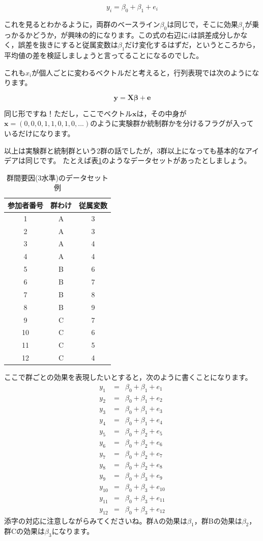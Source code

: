 \documentclass{ltjsbook}
\begin{document}
\[ y_i = \beta_0 + \beta_1 + e_i \]

これを見るとわかるように，両群のベースライン$\beta_0$は同じで，そこに効果$\beta_1$が乗っかるかどうか，が興味の的になります。この式の右辺に$i$は誤差成分しかなく，誤差を抜きにすると従属変数は$\beta_1$だけ変化するはずだ，というところから，平均値の差を検証しましょうと言ってることになるのでした。

これも$x_i$が個人ごとに変わるベクトルだと考えると，行列表現では次のようになります。

\[ \bm{y} = \bm{X\beta} + \bm{e} \]

同じ形ですね！ただし，ここでベクトル$\bm{x}$は，その中身が$\bm{x} = ( 0,0,0,1,1,0,1,0,...)$のように実験群か統制群かを分けるフラグが入っているだけになります。

以上は実験群と統制群という2群の話でしたが，3群以上になっても基本的なアイデアは同じです。
たとえば表\ref{tbl:07_01}のようなデータセットがあったとしましょう。
\begin{table}[ht]
	\centering
	\caption{群間要因(3水準)のデータセット例}
	\begin{tabular}{ccc}
		参加者番号 & 群わけ & 従属変数 \\\hline
		1     & A   & 3    \\
		2     & A   & 3    \\
		3     & A   & 4    \\
		4     & A   & 4    \\
		5     & B   & 6    \\
		6     & B   & 7    \\
		7     & B   & 8    \\
		8     & B   & 9    \\
		9     & C   & 7    \\
		10    & C   & 6    \\
		11    & C   & 5    \\
		12    & C   & 4    \\\hline
	\end{tabular}
	\label{tbl:07_01}
\end{table}

ここで群ごとの効果を表現したいとすると，次のように書くことになります。
\begin{eqnarray*}
	y_1 &=& \beta_0 + \beta_1 + e_1 \\
	y_2 &=& \beta_0 + \beta_1 + e_2 \\
	y_3 &=& \beta_0 + \beta_1 + e_3 \\
	y_4 &=& \beta_0 + \beta_1 + e_4 \\
	y_5 &=& \beta_0 + \beta_2 + e_5 \\
	y_6 &=& \beta_0 + \beta_2 + e_6 \\
	y_7 &=& \beta_0 + \beta_2 + e_7 \\
	y_8 &=& \beta_0 + \beta_2 + e_8 \\
	y_9 &=& \beta_0 + \beta_3 + e_9 \\
	y_{10} &=& \beta_0 + \beta_3 + e_{10} \\
	y_{11} &=& \beta_0 + \beta_3 + e_{11} \\
	y_{12} &=& \beta_0 + \beta_3 + e_{12}
\end{eqnarray*}
添字の対応に注意しながらみてくださいね。群Aの効果は$\beta_1$，群Bの効果は$\beta_2$，群Cの効果は$\beta_3$になります。
\end{document}
